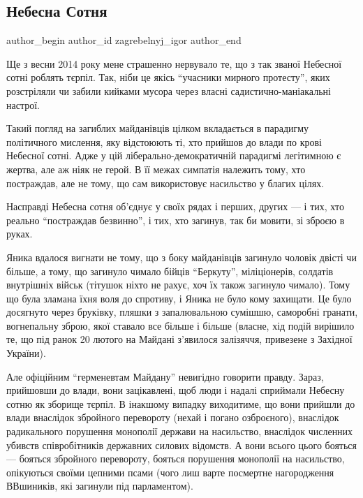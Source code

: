  
 
 
 
 
 
\subsection{Небесна Сотня}
\label{sec:08_09_2015.fb.zagrebelnyj_igor.1.nebesna_sotnja}
 
\ifcmt
 author_begin
   author_id zagrebelnyj_igor
 author_end
\fi

Ще з весни 2014 року мене страшенно нервувало те, що з так званої Небесної
сотні роблять тєрпіл. Так, ніби це якісь \enquote{учасники мирного протесту}, яких
розстріляли чи забили кийками мусора через власні садистично-маніакальні
настрої.

Такий погляд на загиблих майданівців цілком вкладається в парадигму політичного
мислення, яку відстоюють ті, хто прийшов до влади по крові Небесної сотні. Адже
у цій ліберально-демократичній парадигмі легітимною є жертва, але аж ніяк не
герой. В її межах симпатія належить тому, хто постраждав, але не тому, що сам
використовує насильство у благих цілях.

Насправді Небесна сотня об'єднує у своїх рядах і перших, других — і тих, хто
реально \enquote{постраждав безвинно}, і тих, хто загинув, так би мовити, зі зброєю в
руках.

Яника вдалося вигнати не тому, що з боку майданівців загинуло чоловік двісті чи
більше, а тому, що загинуло чимало бійців \enquote{Беркуту}, міліціонерів, солдатів
внутрішніх військ (тітушок ніхто не рахує, хоч їх також загинуло чимало).  Тому
що була зламана їхня воля до спротиву, і Яника не було кому захищати. Це було
досягнуто через бруківку, пляшки з запалювальною сумішшю, саморобні гранати,
вогнепальну зброю, якої ставало все більше і більше (власне, хід подій вирішило
те, що під ранок 20 лютого на Майдані з'явилося залізяччя, привезене з Західної
України).

Але офіційним \enquote{герменевтам Майдану} невигідно говорити правду. Зараз, прийшовши
до влади, вони зацікавлені, щоб люди і надалі сприймали Небесну сотню як
зборище тєрпіл. В інакшому випадку виходитиме, що вони прийшли до влади
внаслідок збройного перевороту (нехай і погано озброєного), внаслідок
радикального порушення монополії держави на насильство, внаслідок численних
убивств співробітників державних силових відомств. А вони всього цього бояться
— бояться збройного перевороту, бояться порушення монополії на насильство,
опікуються своїми цепними псами (чого лиш варте посмертне нагородження
ВВшиників, які загинули під парламентом).

